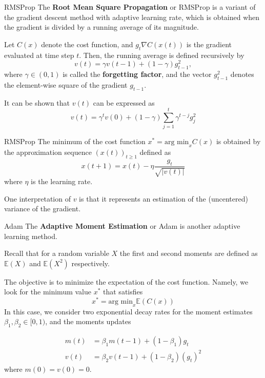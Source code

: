 \documentclass{beamer}
\begin{document}
\begin{frame}{RMSProp}
	 The \textbf{Root Mean Square Propagation} or RMSProp is a variant of the gradient descent method with adaptive learning rate, which is obtained when the gradient is divided by a running average of its magnitude.
	 
	 Let $C(x)$ denote the cost function, and $g_t \nabla C(x(t))$ is the gradient evaluated at time step $t$. Then, the running average is defined recursively by
	 \begin{equation*}
	 	v(t)=\gamma v(t-1)+(1-\gamma)g_{t-1}^2,
	 \end{equation*}
	 where $\gamma\in (0,1)$ is called the \textbf{forgetting factor}, and the vector $g_{t-1}^2$ denotes the element-wise square of the gradient $g_{t-1}$. 
	 
	 It can be shown that  $v(t)$ can be expressed as
	 \begin{equation*}
	 	v(t)= \gamma^t v(0)+ (1-\gamma) \sum_{j=1}^t \gamma^{t-j}g_j^2
	 \end{equation*}
	 
\end{frame}
\begin{frame}{RMSProp}
	The minimum of the cost function $x^* = \text{arg min}_x C(x)$ is obtained by the approximation sequence $(x(t))_{t\ge 1}$ defined as
	\begin{equation*}
		x(t+1)= x(t)- \eta \frac{g_t}{\sqrt{|v(t)|}}
	\end{equation*}
where $\eta$ is the learning rate. 

One interpretation of $v$ is that it represents an estimation of the (uncentered) variance of the gradient. 
\end{frame}

\begin{frame}{Adam}
	The \textbf{Adaptive Moment Estimation} or Adam is another adaptive learning method. 
	
	\begin{fact}
		Recall that for a random variable $X$ the first and second moments are defined as $\mathbb{E}(X)$ and $\mathbb{E}(X^2)$ respectively.
	\end{fact}
	
	
	The objective is to minimize the expectation of the cost function. Namely, we look for the minimum value $x^*$ that satisfies 
	\begin{equation*}
		x^*= \text{arg min}_x \mathbb{E}(C(x))
	\end{equation*}
	In this case, we consider two exponential decay rates for the moment estimates $\beta_1,\beta_2 \in [0,1)$, and the moments updates
	
	\begin{equation*}
		\begin{split}
			m(t)&= \beta_1 m(t-1) + (1-\beta_1)g_t \\
			v(t)&=\beta_2 v(t-1)+ (1-\beta_2)(g_t)^2
		\end{split}
	\end{equation*} 	
where $m(0)=v(0)=0$.  
\end{frame}
\end{document}

